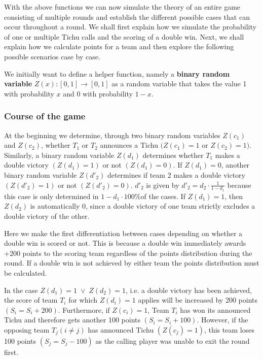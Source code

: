 With the above functions we can now simulate the theory of an entire game consisting of multiple rounds and establish the different possible cases that can occur throughout a round. We shall first explain how we simulate the probability of one or multiple Tichu calls and the scoring of a double win. Next, we shall explain how we calculate points for a team and then explore the following possible scenarios case by case.

\begin{definition}

We initially want to define a helper function, namely a \textbf{binary random variable} $Z(x): [0,1] \to [0,1]$ as a random variable that takes the value 1 with probability $x$ and $0$ with probability $1-x$.

\end{definition}

\subsubsection{Course of the game}
At the beginning we determine, through two binary random variables $Z(c_1)$ and $Z(c_2)$, whether $T_1$ or $T_2$ announces a Tichu $(Z(c_1) = 1$ or $Z(c_2) = 1)$. Similarly, a binary random variable $Z(d_1)$ determines whether $T_1$ makes a double victory $(Z(d_1) = 1)$ or not $(Z(d_1) = 0)$. If $Z(d_1) = 0$, another binary random variable $Z(d'_2)$ determines if team 2 makes a double victory $(Z(d'_2) = 1)$ or not $(Z(d'_2) = 0)$. $d'_2$ is given by $d'_2 =d_2\cdot\frac{1}{1-d_1}$ because this case is only determined in $1-d_1\cdot 100\%$of the cases. If $Z(d_1) = 1$, then $Z(d_2)$ is automatically 0, since a double victory of one team strictly excludes a double victory of the other.

Here we make the first differentiation between cases depending on whether a double win is scored or not. This is because a double win immediately awards +200 points to the scoring team regardless of the points distribution during the round. If a double win is not achieved by either team the points distribution must be calculated.

In the case $Z(d_1) = 1\; \lor\; Z(d_2) = 1$, i.e. a double victory has been achieved, the score of team $T_i$ for which $Z(d_i) = 1$ applies will be increased by 200 points $(S_i = S_i + 200)$. Furthermore, if $Z(c_i) = 1$, Team $T_i$ has won its announced Tichu and therefore gets another 100 points $(S_i = S_i + 100)$. However, if the opposing team $T_j (i \neq j)$ has announced Tichu $(Z(c_j) = 1)$, this team loses 100 points $(S_j = S_j - 100)$ as the calling player was unable to exit the round first.

